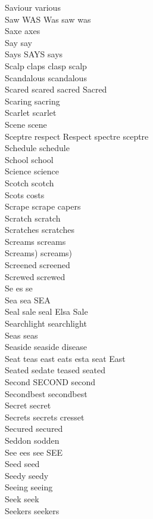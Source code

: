 Saviour various\\
Saw WAS Was saw was\\
Saxe axes\\
Say say\\
Says SAYS says\\
Scalp claps clasp scalp\\
Scandalous scandalous\\
Scared scared sacred Sacred\\
Scaring sacring\\
Scarlet scarlet\\
Scene scene\\
Sceptre respect Respect spectre sceptre\\
Schedule schedule\\
School school\\
Science science\\
Scotch scotch\\
Scots costs\\
Scrape scrape capers\\
Scratch scratch\\
Scratches scratches\\
Screams screams\\
Screams) screams)\\
Screened screened\\
Screwed screwed\\
Se es se\\
Sea sea SEA\\
Seal sale seal Elsa Sale\\
Searchlight searchlight\\
Seas seas\\
Seaside seaside disease\\
Seat teas east eats esta seat East\\
Seated sedate teased seated\\
Second SECOND second\\
Secondbest secondbest\\
Secret secret\\
Secrets secrets cresset\\
Secured secured\\
Seddon sodden\\
See ees see SEE\\
Seed seed\\
Seedy seedy\\
Seeing seeing\\
Seek seek\\
Seekers seekers\\
